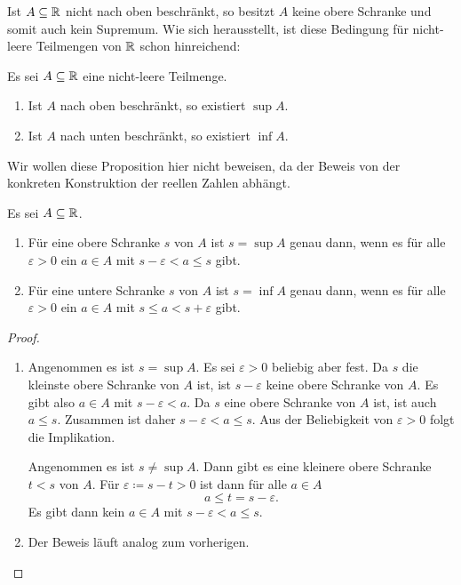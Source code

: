 \documentclass[a4paper,10pt]{article}
\begin{document}
Ist $A \subseteq \mathbb{R}$ nicht nach oben beschränkt, so besitzt $A$ keine obere Schranke und somit auch kein Supremum. Wie sich herausstellt, ist diese Bedingung für nicht-leere Teilmengen von $\mathbb{R}$ schon hinreichend:


\begin{prop}
 Es sei $A \subseteq \mathbb{R}$ eine nicht-leere Teilmenge.
 \begin{enumerate}
  \item
   Ist $A$ nach oben beschränkt, so existiert $\sup A$.
  \item
   Ist $A$ nach unten beschränkt, so existiert $\inf A$.
 \end{enumerate}
\end{prop}


Wir wollen diese Proposition hier nicht beweisen, da der Beweis von der konkreten Konstruktion der reellen Zahlen abhängt.


\begin{lem}
 Es sei $A \subseteq \mathbb{R}$.
 \begin{enumerate}
  \item
   Für eine obere Schranke $s$ von $A$ ist $s = \sup A$ genau dann, wenn es für alle $\varepsilon > 0$ ein $a \in A$ mit $s-\varepsilon < a \leq s$ gibt.
  \item
   Für eine untere Schranke $s$ von $A$ ist $s = \inf A$ genau dann, wenn es für alle $\varepsilon > 0$ ein $a \in A$ mit $s \leq a < s + \varepsilon$ gibt.
 \end{enumerate}
\end{lem}
\begin{proof}
 \begin{enumerate}
  \item
   Angenommen es ist $s = \sup A$. Es sei $\varepsilon > 0$ beliebig aber fest. Da $s$ die kleinste obere Schranke von $A$ ist, ist $s-\varepsilon$ keine obere Schranke von $A$. Es gibt also $a \in A$ mit $s-\varepsilon < a$. Da $s$ eine obere Schranke von $A$ ist, ist auch $a \leq s$. Zusammen ist daher $s-\varepsilon < a \leq s$. Aus der Beliebigkeit von $\varepsilon > 0$ folgt die Implikation.
   
   Angenommen es ist $s \neq \sup A$. Dann gibt es eine kleinere obere Schranke $t < s$ von $A$. Für $\varepsilon \coloneqq s-t > 0$ ist dann für alle $a \in A$
   \[
    a \leq t = s-\varepsilon.
   \]
   Es gibt dann kein $a \in A$ mit $s-\varepsilon < a \leq s$.
  \item
   Der Beweis läuft analog zum vorherigen.
  \qedhere
 \end{enumerate}
\end{proof}
\end{document}

